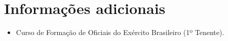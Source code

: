 \documentclass{tccv}
\begin{document}
\section{Informações adicionais}
    
    \begin{itemize}
        \item Curso de Formação de Oficiais do Exército Brasileiro (1º Tenente).
    \end{itemize}
    
\end{document}
